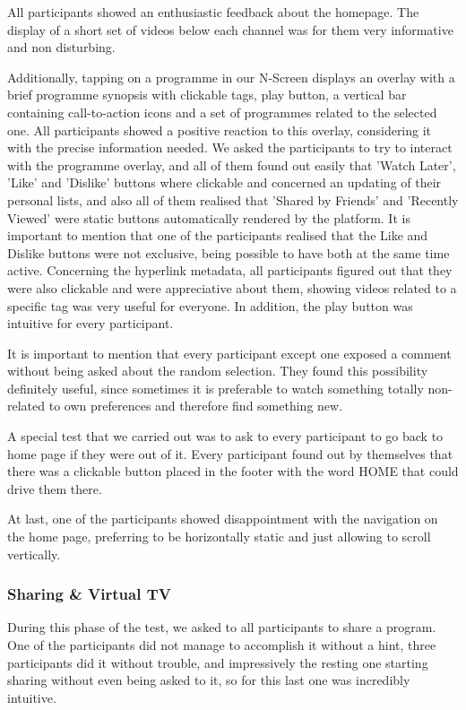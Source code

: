 \documentclass{acm_proc_article-sp}
\begin{document}
All participants showed an enthusiastic feedback about the homepage. The display of a short set of videos below each channel was for them very informative and non disturbing. 

Additionally, tapping on a programme in our N-Screen displays an overlay with a brief programme synopsis with clickable tags, play button, a vertical bar containing call-to-action icons and a set of programmes related to the selected one. All participants showed a positive reaction to this overlay, considering it with the precise information needed. We asked the participants to try to interact with the programme overlay, and all of them found out easily that 'Watch Later', 'Like' and 'Dislike' buttons where clickable and concerned an updating of their personal lists, and also all of them realised that 'Shared by Friends' and 'Recently Viewed' were static buttons automatically rendered by the platform. It is important to mention that one of the participants realised that the Like and Dislike buttons were not exclusive, being possible to have both at the same time active. Concerning the hyperlink metadata, all participants figured out that they were also clickable and were appreciative about them, showing videos related to a specific tag was very useful for everyone.  In addition, the play button was intuitive for every participant.  

It is important to mention that every participant except one exposed a comment without being asked about the random selection. They found this possibility definitely useful, since sometimes it is preferable to watch something totally non-related to own preferences and therefore find something new. 

A special test that we carried out was to ask to every participant to go back to home page if they were out of it. Every participant found out by themselves that there was a clickable button placed in the footer with the word HOME that could drive them there. 

At last, one of the participants showed disappointment with the navigation on the home page, preferring to be horizontally static and just allowing to scroll vertically. 
\subsubsection{Sharing \& Virtual TV}
 
During this phase of the test, we asked to all participants to share a program. One of the participants did not manage to accomplish it without a hint, three participants did it without trouble, and impressively the resting one starting sharing without even being asked to it, so for this last one was incredibly intuitive. 
\end{document}
